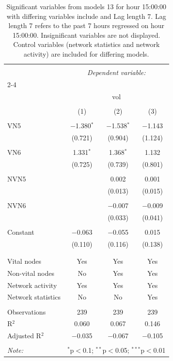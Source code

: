 
\begin{table}[!htbp] \centering 
  \caption{Significant variables from models 13 for hour 15:00:00 with differing variables include 
                               and Lag length 7. Lag length 7 refers to the past 7 hours regressed on hour 15:00:00. 
                               Insignificant variables are not displayed. 
                               Control variables (network statistics and network activity) are 
                               included for differing models.} 
  \label{Volumemodels2_t_hourlagged2} 
\scriptsize 
\begin{tabular}{@{\extracolsep{5pt}}lccc} 
\\[-1.8ex]\hline 
\hline \\[-1.8ex] 
 & \multicolumn{3}{c}{\textit{Dependent variable:}} \\ 
\cline{2-4} 
\\[-1.8ex] & \multicolumn{3}{c}{vol} \\ 
\\[-1.8ex] & (1) & (2) & (3)\\ 
\hline \\[-1.8ex] 
 VN5 & $-$1.380$^{*}$ & $-$1.538$^{*}$ & $-$1.143 \\ 
  & (0.721) & (0.904) & (1.124) \\ 
  & & & \\ 
 VN6 & 1.331$^{*}$ & 1.368$^{*}$ & 1.132 \\ 
  & (0.725) & (0.739) & (0.801) \\ 
  & & & \\ 
 NVN5 &  & 0.002 & 0.001 \\ 
  &  & (0.013) & (0.015) \\ 
  & & & \\ 
 NVN6 &  & $-$0.007 & $-$0.009 \\ 
  &  & (0.033) & (0.041) \\ 
  & & & \\ 
 Constant & $-$0.063 & $-$0.055 & 0.015 \\ 
  & (0.110) & (0.116) & (0.138) \\ 
  & & & \\ 
\hline \\[-1.8ex] 
Vital nodes & Yes & Yes & Yes \\ 
Non-vital nodes & No & Yes & Yes \\ 
Network activity & Yes & Yes & Yes \\ 
Network statistics & No & No & Yes \\ 
\hline &  &  &  \\ 
Observations & 239 & 239 & 239 \\ 
R$^{2}$ & 0.060 & 0.067 & 0.146 \\ 
Adjusted R$^{2}$ & $-$0.035 & $-$0.067 & $-$0.105 \\ 
\hline 
\hline \\[-1.8ex] 
\textit{Note:}  & \multicolumn{3}{r}{$^{*}$p$<$0.1; $^{**}$p$<$0.05; $^{***}$p$<$0.01} \\ 
\end{tabular} 
\end{table} 
